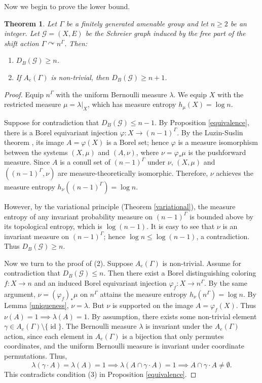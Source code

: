 \documentclass[11pt, reqno, a4paper]{amsart}
\theoremstyle{plain}
\newtheorem{theorem}{Theorem}[section]
\theoremstyle{definition}
\theoremstyle{remark}
\newcommand{\id}{\operatorname{id}}
\begin{document}
Now we begin to prove the lower bound.

\begin{theorem}\label{lowerbound}
Let $\Gamma$ be a finitely generated amenable group and let $n\ge 2$ be an integer. Let $\mathcal{G}=(X,E)$ be the Schreier graph induced by the free part of the shift action $\Gamma \curvearrowright n^\Gamma$. Then:
\begin{enumerate}
    \item  $D_{B}(\mathcal{G})\ge n$.
    \item  If $A_{e}(\Gamma)$ is non-trivial, then $D_{B}(\mathcal{G}) \ge n+1$.
\end{enumerate}
\end{theorem}

\begin{proof}
Equip $n^\Gamma$ with the uniform Bernoulli measure $\lambda$. We equip $X$ with the restricted measure $\mu = \lambda|_X$, which has measure entropy $h_{\mu}(X)=\log n$. 

 Suppose for contradiction that $D_B(\mathcal{G}) \le n-1$. By Proposition \ref{equivalence}, there is a Borel equivariant injection $\varphi: X\longrightarrow (n-1)^\Gamma$. By the Luzin-Suslin theorem \cite[Theorem 15.1]{Kec95}, its image $A = \varphi(X)$ is a Borel set; hence $\varphi$ is a measure isomorphism between the systems $(X,\mu)$ and $(A,\nu)$, where $\nu = \varphi_* \mu$ is the pushforward measure. Since $A$ is a conull set of $(n-1)^{\Gamma}$ under $\nu$, $(X,\mu)$ and $((n-1)^{\Gamma},\nu)$ are measure-theoretically isomorphic. Therefore, $\nu$  achieves the  measure entropy $h_\nu((n-1)^\Gamma)=\log n$. 

However, by the variational principle (Theorem \ref{variational}), the measure entropy of any invariant probability measure on  $(n-1)^\Gamma$ is  bounded  above by its topological entropy, which is  $\log (n-1)$. It is easy to see that $\nu$ is an invariant measure on $(n-1)^{\Gamma}$; hence $\log n \le \log (n-1)$, a contradiction. Thus $D_B(\mathcal{G}) \ge n$.

Now we turn to the proof of (2). Suppose $A_e(\Gamma)$ is non-trivial. Assume for contradiction that $D_B(\mathcal{G}) \le n$. Then there exist a Borel distinguishing coloring $f:X\longrightarrow n$ and an induced Borel equivariant injection $\varphi_f:X\longrightarrow n^\Gamma$. By the same argument, $\nu = (\varphi_f)_*\mu$ on $n^\Gamma$  attains the measure entropy $h_\nu(n^\Gamma)=\log n$. By Lemma \ref{uniqueness},  $\nu=\lambda$. But $\nu$ is supported on the image $A=\varphi_f(X)$. Thus $\nu(A)=1\implies \lambda(A)=1$.
By assumption, there exists some non-trivial element $\gamma \in A_e(\Gamma) \setminus \{\id\}$. The Bernoulli measure $\lambda$ is  invariant under the $A_e(\Gamma)$ action, since each element in $A_e(\Gamma)$ is a bijection that only permutes coordinates, and the uniform Bernoulli  measure is
invariant under coordinate permutations. Thus, 
\[ \lambda(\gamma \cdot A)=\lambda(A)=1\implies\lambda (A\cap \gamma\cdot A)=1\implies A\cap\gamma\cdot A\ne \emptyset. \]
This contradicts condition (3)  in Proposition \ref{equivalence}.
\end{proof}
\end{document}
